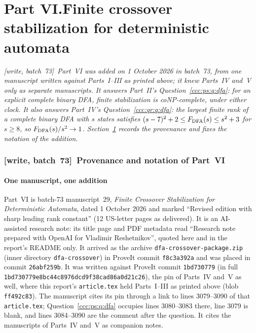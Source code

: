 \documentclass[11pt,letterpaper]{article}
\theoremstyle{definition}
\theoremstyle{remark}
\newcommand{\wsevthree}{\textup{[write, batch~73]}}
\begin{document}
\clearpage
{}\part*{Part VI.\quad Finite crossover stabilization for deterministic automata}

\noindent\emph{\wsevthree\ Part~VI was added on 1 October 2026 in batch~73,
from one manuscript written against Parts~I--III as printed above; it knew
Parts~IV and~V only as separate manuscripts. It answers Part~II's
Question~\ref{ccc:ps:q:dfa}: for an explicit complete binary DFA, finite
stabilization is coNP-complete, under either clock. It also answers
Part~IV's Question~\ref{ccc:qr:q:dfa}: the largest finite rank of a complete
binary DFA with $s$ states satisfies $(s-7)^2+2\le F_{\rm DFA}(s)\le s^2+3$
for $s\ge8$, so $F_{\rm DFA}(s)/s^2\to1$. Section~\ref{ccc:dc:sec:provenance}
records the provenance and fixes the notation of the addition.}

\section{\texorpdfstring{\wsevthree\ }{}Provenance and notation of Part~VI}
\label{ccc:dc:sec:provenance}

\subsection{One manuscript, one addition}\label{ccc:dc:sec:source}

Part~VI is batch-73 manuscript~29, \emph{Finite Crossover Stabilization for
Deterministic Automata}, dated 1 October 2026 and marked ``Revised edition
with sharp leading rank constant'' (12 US-letter pages as delivered). It is
an AI-assisted research note: its title page and PDF metadata read ``Research
note prepared with OpenAI for Vladimir Reshetnikov'', quoted here and in the
report's README only. It arrived as the archive
\texttt{dfa-crossover-package.zip} (inner directory \texttt{dfa-crossover})
in ProveIt commit \texttt{f8c3a392a} and was placed in commit
\texttt{26abf259b}. It was written against ProveIt commit \texttt{1bd730779}
(in full \nolinkurl{1bd730779e8bc44c8976dcd9f38cad86a0d21c26}), the pin of
Parts~IV and~V as well, where this report's \texttt{article.tex} held
Parts~I--III as printed above (blob \texttt{ff492c83}). The manuscript cites
its pin through a link to lines 3079--3090 of that \texttt{article.tex};
Question~\ref{ccc:ps:q:dfa} occupies lines 3080--3083 there, line 3079 is
blank, and lines 3084--3090 are the comment after the question. It cites the manuscripts of Parts~IV and~V as
companion notes.
\end{document}
